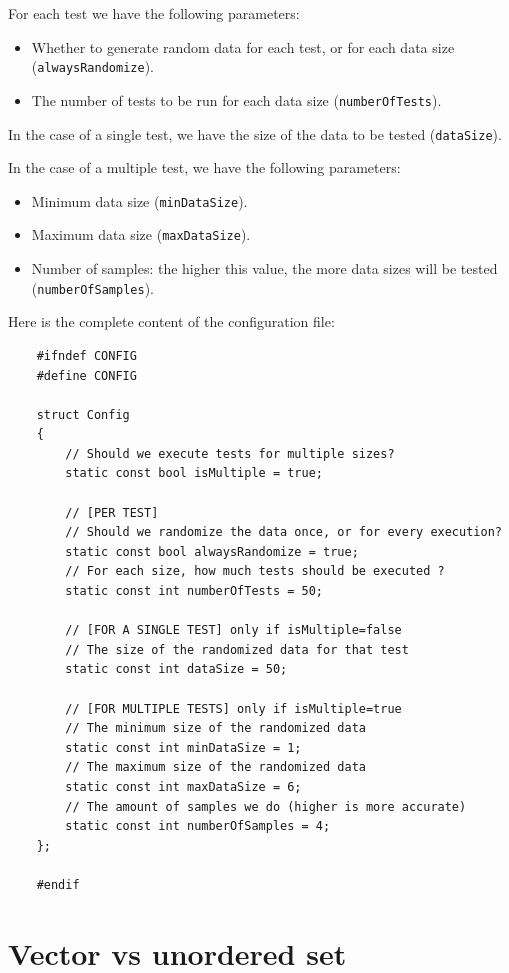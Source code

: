 \documentclass[conference]{IEEEtran}
\def\code#1{\texttt{#1}}
\begin{document}
For each test we have the following parameters:
\begin{itemize}
	\item Whether to generate random data for each test, or for each data size (\code{alwaysRandomize}).
	\item The number of tests to be run for each data size (\code{numberOfTests}).
\end{itemize}

In the case of a single test, we have the size of the data to be tested (\code{dataSize}).

In the case of a multiple test, we have the following parameters:
\begin{itemize}
	\item Minimum data size (\code{minDataSize}).
	\item Maximum data size (\code{maxDataSize}).
	\item Number of samples: the higher this value, the more data sizes will be tested (\code{numberOfSamples}).
\end{itemize}

Here is the complete content of the configuration file:
\begin{lstlisting}
	#ifndef CONFIG
	#define CONFIG
	
	struct Config
	{
		// Should we execute tests for multiple sizes?
		static const bool isMultiple = true;
		
		// [PER TEST]
		// Should we randomize the data once, or for every execution?
		static const bool alwaysRandomize = true;
		// For each size, how much tests should be executed ?
		static const int numberOfTests = 50;
		
		// [FOR A SINGLE TEST] only if isMultiple=false
		// The size of the randomized data for that test
		static const int dataSize = 50;
		
		// [FOR MULTIPLE TESTS] only if isMultiple=true
		// The minimum size of the randomized data
		static const int minDataSize = 1;
		// The maximum size of the randomized data
		static const int maxDataSize = 6;
		// The amount of samples we do (higher is more accurate)
		static const int numberOfSamples = 4;
	};
	
	#endif
\end{lstlisting}

\section{Vector vs unordered set}
\end{document}
